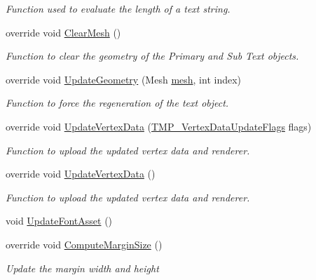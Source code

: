 \begin{DoxyCompactItemize}
\begin{DoxyCompactList}\small\item\em Function used to evaluate the length of a text string. \end{DoxyCompactList}\item 
override void \mbox{\hyperlink{class_t_m_pro_1_1_text_mesh_pro_u_g_u_i_a2b3b3a1a8d320d9f39751e7f05b1b2be}{Clear\+Mesh}} ()
\begin{DoxyCompactList}\small\item\em Function to clear the geometry of the Primary and Sub Text objects. \end{DoxyCompactList}\item 
override void \mbox{\hyperlink{class_t_m_pro_1_1_text_mesh_pro_u_g_u_i_a111121630f131c81af75f55f31e392e2}{Update\+Geometry}} (Mesh \mbox{\hyperlink{class_t_m_pro_1_1_text_mesh_pro_u_g_u_i_a0c6c3fd5daff551039308552d0e9fa3c}{mesh}}, int index)
\begin{DoxyCompactList}\small\item\em Function to force the regeneration of the text object. \end{DoxyCompactList}\item 
override void \mbox{\hyperlink{class_t_m_pro_1_1_text_mesh_pro_u_g_u_i_a2fb671e18fda5d2e996ed13347fefffa}{Update\+Vertex\+Data}} (\mbox{\hyperlink{namespace_t_m_pro_a517464fab2ef7ff5b9658d2acaf49a57}{T\+M\+P\+\_\+\+Vertex\+Data\+Update\+Flags}} flags)
\begin{DoxyCompactList}\small\item\em Function to upload the updated vertex data and renderer. \end{DoxyCompactList}\item 
override void \mbox{\hyperlink{class_t_m_pro_1_1_text_mesh_pro_u_g_u_i_a3f32882137aab111603158a4452bc53b}{Update\+Vertex\+Data}} ()
\begin{DoxyCompactList}\small\item\em Function to upload the updated vertex data and renderer. \end{DoxyCompactList}\item 
void \mbox{\hyperlink{class_t_m_pro_1_1_text_mesh_pro_u_g_u_i_ac38b46e6697cbc9e1f8ba43350e97469}{Update\+Font\+Asset}} ()
\item 
override void \mbox{\hyperlink{class_t_m_pro_1_1_text_mesh_pro_u_g_u_i_a585823ae58e0b54f1497ced737567a03}{Compute\+Margin\+Size}} ()
\begin{DoxyCompactList}\small\item\em Update the margin width and height \end{DoxyCompactList}\end{DoxyCompactItemize}
